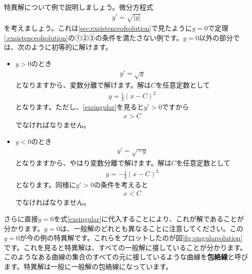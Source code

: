 \documentclass[report,paper=a4, fontsize=12pt, line_length=16cm, number_of_lines=33,dvipdfmx]{jlreq}
\numberwithin{equation}{section}
\newcommand{\strong}[1]{\textsf{\bfseries #1}}
\begin{document}
特異解について例で説明しましょう。微分方程式
\begin{align}
  y'=\sqrt{|y|}\label{exsingular}
\end{align}
を考えましょう。これは\ref{sec:exsistenceofsolution}で見たように$y=0$で定理\ref{:exsistenceofsolution}の①②③の条件を満たさない例です。$y=0$以外の部分では、次のように初等的に解けます。
\begin{itemize}
  \item $y>0$のとき
  \begin{align}
    y'=\sqrt{y}
  \end{align}
  となりますから、変数分離で解けます。解は$C$を任意定数として
  \begin{align}
    y=\frac{1}{4}(x-C)^2
  \end{align}
  となります。ただし、\eqref{exsingular}を見ると$y'>0$ですから
  \begin{align}
    x>C
  \end{align}
  でなければなりません。
  \item $y<0$のとき
  \begin{align}
    y'=\sqrt{-y}
  \end{align}
  となりますから、やはり変数分離で解けます。解は$C$を任意定数として
  \begin{align}
    y=-\frac{1}{4}(x-C)^2
  \end{align}
  となります。同様に$y'>0$の条件を考えると
  \begin{align}
    x<C
  \end{align}
  でなければなりません。
\end{itemize}
さらに直接$y=0$を式\eqref{exsingular}に代入することにより、これが解であることが分かります。$y=0$は、一般解のどれとも異なることに注意してください。この$y=0$が今の例の特異解です。これらをプロットしたのが図\ref{fig:singularsolution}です。これを見ると特異解は、すべての一般解に接していることが分かります。このようなある曲線の集合のすべての元に接しているような曲線を\strong{包絡線}と呼びます。特異解は一般に一般解の包絡線になっています。
\end{document}
